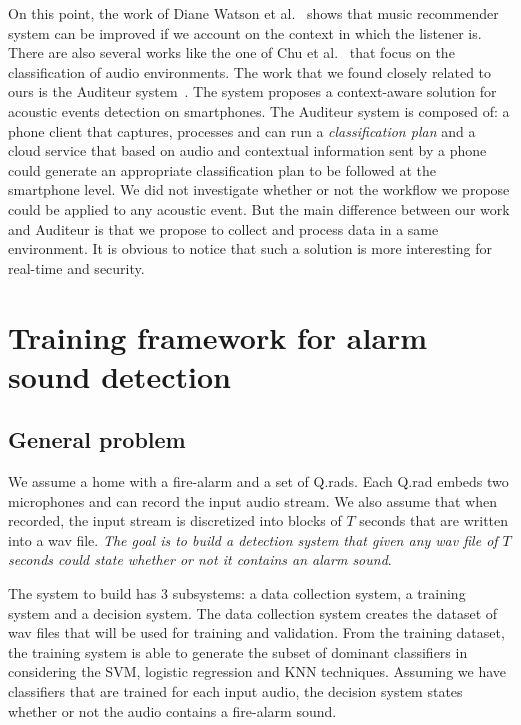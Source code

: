 \documentclass[10pt, conference, compsocconf]{IEEEtran}
\begin{document}
On this point, the work of Diane Watson et al.~\cite{watson_-situ_2012} shows that music recommender system can be improved if we 
account on the context in which the listener is. There are also several works like the one of Chu et al.~\cite{Chu:2009:ESR:1650051.1650059} 
that focus on the classification of audio environments. The work that we found closely related to ours is the Auditeur system~\cite{Nirjon:2013:AMS:2462456.2464446}. The system proposes a context-aware solution for acoustic events detection on smartphones. 
The Auditeur system is composed of: a phone client that captures, processes and can run a {\it classification plan} and a cloud 
service that based on audio and contextual information sent by a phone could generate an appropriate classification plan to be 
followed at the smartphone level. We did not investigate whether or not the workflow we propose could be applied 
to any acoustic event. But the main difference between our work and Auditeur is that we propose to collect and process 
data in a same environment. It is obvious to notice that such a solution is more interesting for real-time and security.



\section{Training framework for alarm sound detection } \label{Framework}

\subsection{General problem}

We assume a home with a fire-alarm and a set of Q.rads. Each Q.rad embeds two microphones and can record the input audio 
stream. We also assume that when recorded, the input stream is discretized into blocks of $T$ seconds that are written into a 
wav file. {\it The goal is to build  a detection system that given any wav file of $T$ seconds could state whether or not it contains 
an alarm sound}.

The system to build has $3$ subsystems: a data collection system, a training system and a decision system. 
The data collection system creates the dataset of wav files that will be used for training and validation. 
From the training dataset, the training system is able to generate the subset of dominant classifiers in considering 
the SVM, logistic regression and KNN techniques. Assuming we have classifiers that are trained for each input audio, 
the decision system states whether or not the audio contains a fire-alarm sound.
\end{document}
